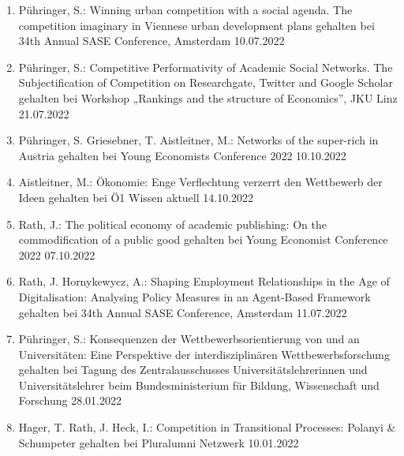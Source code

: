 \begin{enumerate}
	\item Pühringer, S.: Winning urban competition with a social agenda. The competition imaginary in Viennese urban development plans gehalten bei 34th Annual SASE Conference, Amsterdam 10.07.2022
	\item Pühringer, S.: Competitive Performativity of Academic Social Networks. The Subjectification of Competition on Researchgate, Twitter and Google Scholar gehalten bei Workshop „Rankings and the structure of Economics”, JKU Linz 21.07.2022
	\item Pühringer, S. Griesebner, T. Aistleitner, M.: Networks of the super-rich in Austria gehalten bei Young Economists Conference 2022 10.10.2022
	\item Aistleitner, M.: Ökonomie: Enge Verflechtung verzerrt den Wettbewerb der Ideen gehalten bei Ö1 Wissen aktuell 14.10.2022
	\item Rath, J.: The political economy of academic publishing: On the commodification of a public good gehalten bei Young Economist Conference 2022 07.10.2022
	\item Rath, J. Hornykewycz, A.: Shaping Employment Relationships in the Age of Digitalisation: Analysing Policy Measures in an Agent-Based Framework gehalten bei 34th Annual SASE Conference, Amsterdam 11.07.2022
	\item Pühringer, S.: Konsequenzen der Wettbewerbsorientierung von und an Universitäten: Eine Perspektive der interdisziplinären Wettbewerbsforschung gehalten bei Tagung des Zentralausschusses Universitätslehrerinnen und Universitätslehrer beim Bundesministerium für Bildung, Wissenschaft und Forschung 28.01.2022
	\item Hager, T. Rath, J. Heck, I.: Competition in Transitional Processes: Polanyi \& Schumpeter gehalten bei Pluralumni Netzwerk 10.01.2022
\end{enumerate}
